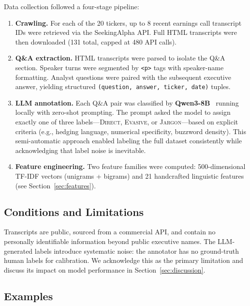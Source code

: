 \documentclass[12pt]{article}
\begin{document}
Data collection followed a four-stage pipeline:
\begin{enumerate}[nosep]
    \item \textbf{Crawling.} For each of the 20 tickers, up to 8 recent
          earnings call transcript IDs were retrieved via the SeekingAlpha API.
          Full HTML transcripts were then downloaded (131 total, capped at
          480 API calls).
    \item \textbf{Q\&A extraction.} HTML transcripts were parsed to isolate
          the Q\&A section. Speaker turns were segmented by
          \texttt{<p>} tags with speaker-name formatting. Analyst questions
          were paired with the subsequent executive answer, yielding
          structured \texttt{(question, answer, ticker, date)} tuples.
    \item \textbf{LLM annotation.} Each Q\&A pair was classified by
          \textbf{Qwen3-8B}~\cite{qwen} running locally with zero-shot
          prompting. The prompt asked the model to assign exactly one of
          three labels---\textsc{Direct}, \textsc{Evasive}, or
          \textsc{Jargon}---based on explicit criteria (e.g., hedging
          language, numerical specificity, buzzword density). This
          semi-automatic approach enabled labeling the full dataset
          consistently while acknowledging that label noise is inevitable.
    \item \textbf{Feature engineering.} Two feature families were computed:
          500-dimensional TF-IDF vectors (unigrams + bigrams) and 21
          handcrafted linguistic features (see Section~\ref{sec:features}).
\end{enumerate}

\subsection{Conditions and Limitations}

Transcripts are public, sourced from a commercial API, and contain no
personally identifiable information beyond public executive names. The
LLM-generated labels introduce systematic noise: the annotator has no
ground-truth human labels for calibration. We acknowledge this as the
primary limitation and discuss its impact on model performance in
Section~\ref{sec:discussion}.

\subsection{Examples}
\end{document}
